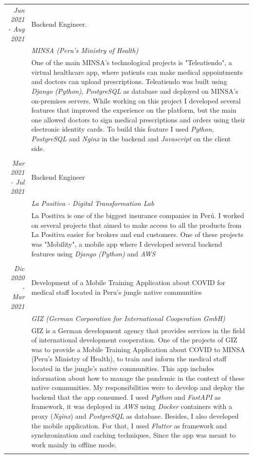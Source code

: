 \documentclass[a4paper,10pt]{article}
\begin{document}
\begin{longtable}{r|p{11cm}}
  \emph{Jun 2021 - Aug 2021} & Backend Engineer.\\& \emph{MINSA (Peru's Ministry of Health)}\\ & \footnotesize{One of the main MINSA's technological projects is "Teleatiendo", a virtual healthcare app, where patients can make medical appointments and doctors can upload prescriptions. Teleatiendo was built using \emph{Django (Python)}, \emph{PostgreSQL} as database and deployed on MINSA's on-premises servers. While working on this project I developed several features that improved the experience on the platform, but the main one allowed doctors to sign medical prescriptions and orders using their electronic identity cards. To build this feature I used \emph{Python, PostgreSQL} and \emph{Nginx} in the backend and \emph{Javascript} on the client side.}\\&\\
  \emph{Mar 2021 - Jul 2021} & Backend Engineer\\& \emph{La Positiva - Digital Transformation Lab}\\ & \footnotesize{La Positiva is one of the biggest insurance companies in Perú. I worked on several projects that aimed to make access to all the products from La Positiva easier for brokers and end customers. One of these projects was "Mobility", a mobile app where I developed several backend features using \emph{ Django (Python)} and \emph{AWS}}\\&\\
  \emph{Dic 2020 - Mar 2021} & Development of a Mobile Training Application about COVID for medical staff located in Peru's jungle native communities\\& \emph{GIZ (German Corporation for International Cooperation GmbH)}\\ & \footnotesize{GIZ is a German development agency that provides services in the field of international development cooperation. One of the projects of GIZ was to provide a Mobile Training Application about COVID to MINSA (Peru's Ministry of Health), to train and inform the medical staff located in the jungle's native communities. This app includes information about how to manage the pandemic in the context of these native communities. My responsibilities were to develop and deploy the backend that the app consumed. I used \emph{Python} and \emph{FastAPI} as framework, it was deployed in \emph{AWS} using \emph{Docker} containers with a proxy (\emph{Nginx}) and \emph{PostgreSQL} as database. Besides, I also developed the mobile application. For that, I used \emph{Flutter} as framework and synchronization and caching techniques, Since the app was meant to work mainly in offline mode.}\\&\\

\end{longtable}
\end{document}
